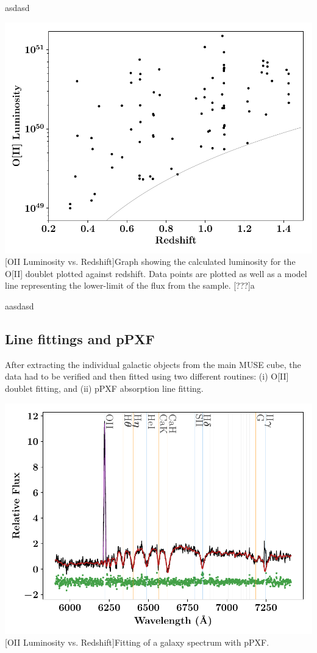 \documentclass[12pt, onecolumn]{revtex4}    %
\begin{document}

asdasd

\begin{center}
\includegraphics[width=0.5\linewidth]{data/o_ii_luminosity_vs_redshift}
[OII Luminosity vs. Redshift]{Graph showing the calculated luminosity for the O[II] doublet plotted against redshift. Data points are plotted as well as a model line representing the lower-limit of the flux from the sample. [???]a}
\label{fig:oiiluminosity_redshift}
\end{center}

aasdasd

\subsection{Line fittings and pPXF} 

After extracting the individual galactic objects from the main MUSE cube, the data had to be verified and then fitted using two different routines: (i) O[II] doublet fitting, and (ii) pPXF absorption line fitting. 

\begin{center}
\includegraphics[width=0.5\linewidth]{data/cube_1804_fitted}
[OII Luminosity vs. Redshift]{Fitting of a galaxy spectrum with pPXF.}
\label{fig:oiiluminosity_redshift}
\end{center}
\end{document}
